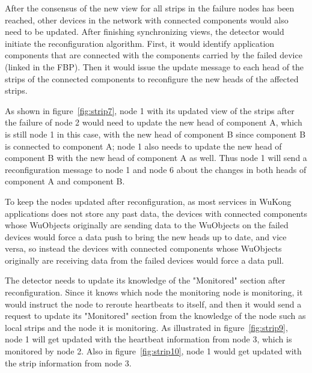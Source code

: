 After the consensus of the new view for all strips in the failure nodes has
been reached, other devices in the network with connected components would also
need to be updated. After finishing synchronizing views, the detector would
initiate the reconfiguration algorithm. First, it would identify
application components that are connected with the components carried by the
failed device (linked in the FBP). Then it would issue the update message
to each head of the strips of the connected components to reconfigure the new
heads of the affected strips.

As shown in figure~\ref{fig:strip7}, node 1 with its updated view of the strips
after the failure of node 2 would need to update the new head of component A,
which is still node 1 in this case, with the new head of component B since
component B is connected to component A; node 1 also needs to update the new
head of component B with the new head of component A as well. Thus node 1 will
send a reconfiguration message to node 1 and node 6 about the changes in both
heads of component A and component B.

To keep the nodes updated after reconfiguration, as most services in WuKong
applications does not store any past data, the devices with connected components
whose WuObjects originally are sending data to the WuObjects on the failed
devices would force a data push to bring the new heads up to date, and vice
versa, so instead the devices with connected components whose WuObjects
originally are receiving data from the failed devices would force a data pull.

The detector needs to update its knowledge of the "Monitored" section after
reconfiguration. Since it knows which node the monitoring node is monitoring, it
would instruct the node to reroute heartbeats to itself, and then it would send
a request to update its "Monitored" section from the knowledge of the node such
as local strips and the node it is monitoring. As illustrated in
figure~\ref{fig:strip9}, node 1 will get updated with the heartbeat information
from node 3, which is monitored by node 2. Also in figure~\ref{fig:strip10},
     node 1 would get updated with the strip information from node 3.


